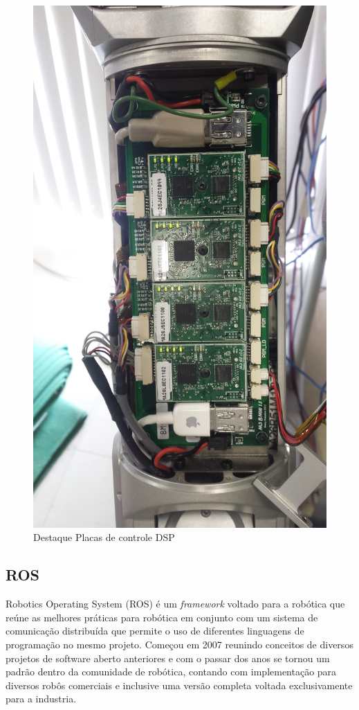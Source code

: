 \begin{figure}[H]
    \centering
    \includegraphics[width = 0.7\linewidth]{figs/dsp-control-wrist}
    \caption{Destaque Placas de controle DSP}
    \label{fig:maxon-flat-servo}
\end{figure}

\subsection{ROS}

Robotics Operating System (ROS) é um \textit{framework} voltado para a robótica que reúne as melhores práticas para robótica em conjunto com um sistema de comunicação distribuída que permite o uso de diferentes linguagens de programação no mesmo projeto. Começou em 2007 reunindo conceitos de diversos projetos de software aberto anteriores e com o passar dos anos se tornou um padrão dentro da comunidade de robótica, contando com implementação para diversos robôs comerciais e inclusive uma versão completa voltada exclusivamente para a industria. \cite{nobody}

